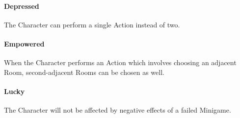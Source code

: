 \paragraph{Depressed} The Character can perform a single Action instead of two.

\paragraph{Empowered} When the Character performs an Action which involves choosing an adjacent Room, second-adjacent Rooms can be chosen as well.

\paragraph{Lucky} The Character will not be affected by negative effects of a failed Minigame.
